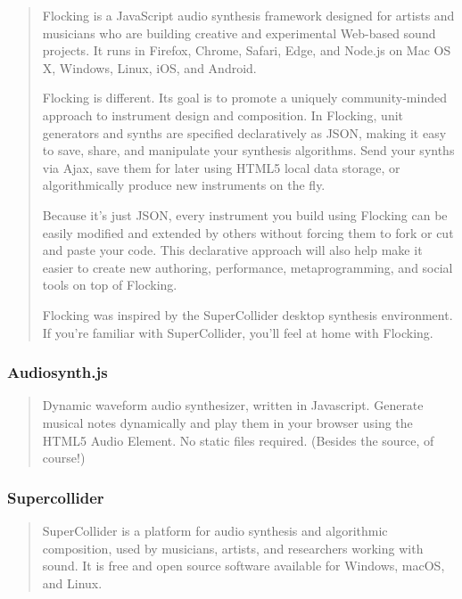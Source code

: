 \documentclass[12pt,a4paper]{article}
\begin{document}
\begin{quote}
Flocking is a JavaScript audio synthesis framework designed for artists and musicians who are building creative and experimental Web-based sound projects. It runs in Firefox, Chrome, Safari, Edge, and Node.js on Mac OS X, Windows, Linux, iOS, and Android.

Flocking is different. Its goal is to promote a uniquely community-minded approach to instrument design and composition. In Flocking, unit generators and synths are specified declaratively as JSON, making it easy to save, share, and manipulate your synthesis algorithms. Send your synths via Ajax, save them for later using HTML5 local data storage, or algorithmically produce new instruments on the fly.

Because it's just JSON, every instrument you build using Flocking can be easily modified and extended by others without forcing them to fork or cut and paste your code. This declarative approach will also help make it easier to create new authoring, performance, metaprogramming, and social tools on top of Flocking.

Flocking was inspired by the SuperCollider desktop synthesis environment. If you're familiar with SuperCollider, you'll feel at home with Flocking. \cite{flocking}
\end{quote}

\subsubsection{Audiosynth.js}

\begin{quote}
Dynamic waveform audio synthesizer, written in Javascript. Generate musical notes dynamically and play them in your browser using the HTML5 Audio Element. No static files required. (Besides the source, of course!) \cite{audiosynth}
\end{quote}

\subsubsection{Supercollider}

\begin{quote}
SuperCollider is a platform for audio synthesis and algorithmic composition, used by musicians, artists, and researchers working with sound. It is free and open source software available for Windows, macOS, and Linux. \cite{supercollider}
\end{quote}
\end{document}
